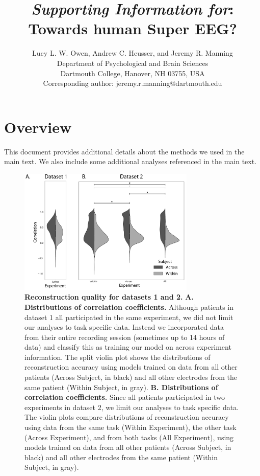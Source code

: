 \documentclass{article}
\title{\textit{Supporting Information for}: Towards human Super EEG?}
\author{Lucy L. W. Owen, Andrew C. Heusser, and Jeremy R. Manning\\Department of Psychological and Brain Sciences\\Dartmouth College, Hanover, NH 03755, USA\\Corresponding author: jeremy.r.manning@dartmouth.edu}
\begin{document}
\maketitle

\setcounter{equation}{0}
\setcounter{figure}{0}
\setcounter{table}{0}
\setcounter{page}{1}
\setcounter{section}{0}
\makeatletter
\renewcommand{\theequation}{S\arabic{equation}}
\renewcommand{\thefigure}{S\arabic{figure}}
\renewcommand{\bibnumfmt}[1]{[S#1]}
\renewcommand{\citenumfont}[1]{S#1}


\section*{Overview}
This document provides additional details about the methods we used in the main text.  We also include some additional analyses referenced in the main text.


\begin{figure}[p!]
\centering
\includegraphics[width=0.75\textwidth]{figs/supplemental_1}
\caption{\small \textbf{Reconstruction quality for datasets 1 and 2.} \textbf{A. Distributions
      of correlation coefficients.}  Although patients in dataset 1 all participated in the same experiment, we did not limit our analyses to task specific data.  Instead we incorporated data from their entire recording session (sometimes up to 14 hours of data) and classify this as training our model on across experiment information. The split violin plot shows the distributions of reconstruction accuracy using models trained on data from all other patients (Across Subject, in black) and all other electrodes from the same patient (Within Subject, in gray). \textbf{B.  Distributions of correlation coefficients.} Since all patients participated in two experiments in dataset 2, we limit our analyses to task specific data.  The violin plots compare distributions of reconstruction accuracy using data from the same task (Within Experiment), the other task (Across Experiment), and from both tasks (All Experiment), using models trained on data from all other patients (Across Subject, in black) and all other electrodes from the same patient (Within Subject, in gray).}
\label{fig:supplemental_1}
\end{figure}
\end{document}

